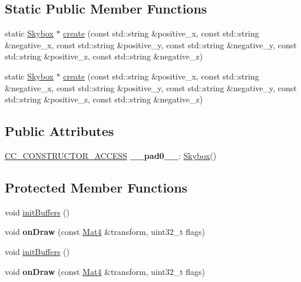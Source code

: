 \subsection*{Static Public Member Functions}
\begin{DoxyCompactItemize}
\item 
static \hyperlink{classSkybox}{Skybox} $\ast$ \hyperlink{classSkybox_a9c53389b720093b09fc2b76dc6cf3185}{create} (const std\+::string \&positive\+\_\+x, const std\+::string \&negative\+\_\+x, const std\+::string \&positive\+\_\+y, const std\+::string \&negative\+\_\+y, const std\+::string \&positive\+\_\+z, const std\+::string \&negative\+\_\+z)
\item 
static \hyperlink{classSkybox}{Skybox} $\ast$ \hyperlink{classSkybox_ac06e47ebaf8002019613c16c606d495e}{create} (const std\+::string \&positive\+\_\+x, const std\+::string \&negative\+\_\+x, const std\+::string \&positive\+\_\+y, const std\+::string \&negative\+\_\+y, const std\+::string \&positive\+\_\+z, const std\+::string \&negative\+\_\+z)
\end{DoxyCompactItemize}
\subsection*{Public Attributes}
\begin{DoxyCompactItemize}
\item 
\mbox{\label{classSkybox_a5b55bbf98abc2b8f9380d35dd4d35ad1}} 
\hyperlink{_2cocos2d_2cocos_2base_2ccConfig_8h_a25ef1314f97c35a2ed3d029b0ead6da0}{C\+C\+\_\+\+C\+O\+N\+S\+T\+R\+U\+C\+T\+O\+R\+\_\+\+A\+C\+C\+E\+SS} {\bfseries \+\_\+\+\_\+pad0\+\_\+\+\_\+}\+: \hyperlink{classSkybox}{Skybox}()
\end{DoxyCompactItemize}
\subsection*{Protected Member Functions}
\begin{DoxyCompactItemize}
\item 
void \hyperlink{classSkybox_aaa891e053fd462be49be63ab24b5651e}{init\+Buffers} ()
\item 
\mbox{\label{classSkybox_a5cb931c08b9eaba19b2277d3375e0735}} 
void {\bfseries on\+Draw} (const \hyperlink{classMat4}{Mat4} \&transform, uint32\+\_\+t flags)
\item 
void \hyperlink{classSkybox_aaa891e053fd462be49be63ab24b5651e}{init\+Buffers} ()
\item 
\mbox{\label{classSkybox_a5cb931c08b9eaba19b2277d3375e0735}} 
void {\bfseries on\+Draw} (const \hyperlink{classMat4}{Mat4} \&transform, uint32\+\_\+t flags)
\end{DoxyCompactItemize}
